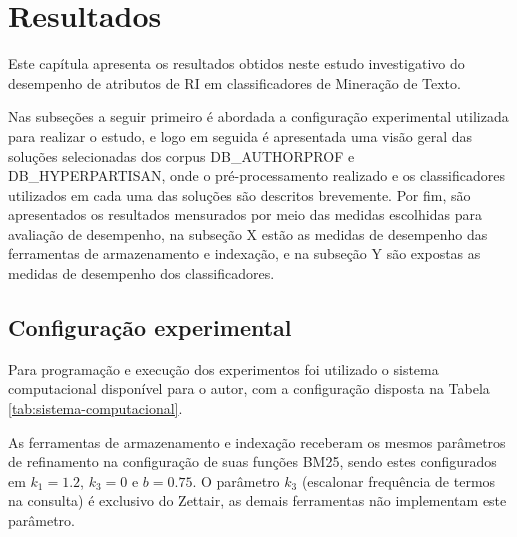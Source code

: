 \chapter{Resultados} \label{ch:Resultados}



	Este capítula apresenta os resultados obtidos neste estudo investigativo do desempenho de atributos de RI em classificadores de Mineração de Texto.

	Nas subseções a seguir primeiro é abordada a configuração experimental utilizada para realizar o estudo, e logo em seguida é apresentada uma visão geral das soluções selecionadas dos corpus DB\_AUTHORPROF e DB\_HYPERPARTISAN, onde o pré-processamento realizado e os classificadores utilizados em cada uma das soluções são descritos brevemente.
	Por fim, são apresentados os resultados mensurados por meio das medidas escolhidas para avaliação de desempenho, na subseção X estão as medidas de desempenho das ferramentas de armazenamento e indexação, e na subseção Y são expostas as medidas de desempenho dos classificadores.


	\section{Configuração experimental} \label{sec:ConfiguraçãoExperimental}

		Para programação e execução dos experimentos foi utilizado o sistema computacional disponível para o autor, com a configuração disposta na Tabela \ref{tab:sistema-computacional}.

		
		
		As ferramentas de armazenamento e indexação receberam os mesmos parâmetros de refinamento na configuração de suas funções BM25, sendo estes configurados em $k_1 = 1.2$, $k_3 = 0$ e $b = 0.75$.
		O parâmetro $k_3$ (escalonar frequência de termos na consulta) é exclusivo do Zettair, as demais ferramentas não implementam este parâmetro.

